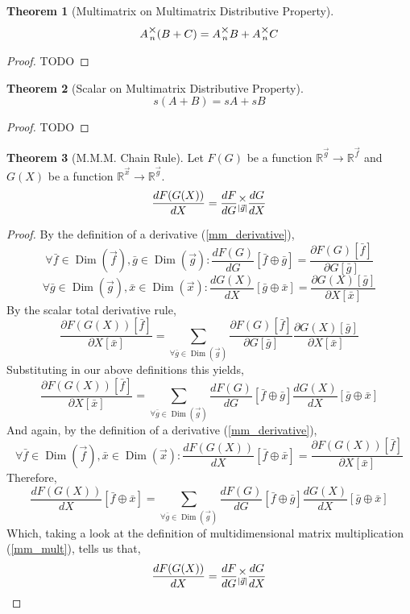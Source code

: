 \documentclass[12pt]{article}
\theoremstyle{definition}
\newtheorem{theorem}{Theorem}[section]
\theoremstyle{case}
\theoremstyle{ppart}
\DeclareMathOperator{\Dim}{Dim}
\newcommand{\mmult}[1]{\text{\raisebox{1ex}{$\underset{#1}{\times}$}}}
\begin{document}
\begin{theorem}[Multimatrix on Multimatrix Distributive Property]
\[ A \mmult{n} (B + C) = A \mmult{n} B + A \mmult{n} C \]
\end{theorem}
\begin{proof}
TODO
\end{proof}

\begin{theorem}[Scalar on Multimatrix Distributive Property]
\[ s(A + B) = sA + sB \]
\end{theorem}
\begin{proof}
TODO
\end{proof}


\begin{theorem}[M.M.M. Chain Rule]
\label{mmm_chain_rule}
Let $F(G)$ be a function $\mathbb{R}^{\vec{g}} \rightarrow \mathbb{R}^{\vec{f}}$
and $G(X)$ be a function $\mathbb{R}^{\vec{x}} \rightarrow \mathbb{R}^{\vec{g}}$.
\[
\frac{dF(G(X))}{dX} = \frac{dF}{dG} \mmult{|\vec{g}|} \frac{dG}{dX}
\]
\end{theorem}
\begin{proof}
By the definition of a derivative (\ref{mm_derivative}),
\[
\forall \bar{f} \in \Dim(\vec{f}), \bar{g} \in \Dim(\vec{g}):
\frac{dF(G)}{dG}[\bar{f} \oplus \bar{g}]
= \frac{\partial F(G)[\bar{f}]}{\partial G[\bar{g}]}
\]
\[
\forall \bar{g} \in \Dim(\vec{g}), \bar{x} \in \Dim(\vec{x}):
\frac{dG(X)}{dX}[\bar{g} \oplus \bar{x}]
= \frac{\partial G(X)[\bar{g}]}{\partial X[\bar{x}]}
\]
By the scalar total derivative rule,
\[
\frac{\partial F(G(X))[\bar{f}]}{\partial X[\bar{x}]}
= \sum_{\forall \bar{g} \in \Dim(\vec{g})} 
\frac{\partial F(G)[\bar{f}]}{\partial G[\bar{g}]}
\frac{\partial G(X)[\bar{g}]}{\partial X[\bar{x}]}
\]
Substituting in our above definitions this yields,
\[
\frac{\partial F(G(X))[\bar{f}]}{\partial X[\bar{x}]}
= \sum_{\forall \bar{g} \in \Dim(\vec{g})} 
\frac{dF(G)}{dG}[\bar{f} \oplus \bar{g}]
\frac{dG(X)}{dX}[\bar{g} \oplus \bar{x}]
\]
And again, by the definition of a derivative (\ref{mm_derivative}),
\[
\forall \bar{f} \in \Dim(\vec{f}), \bar{x} \in \Dim(\vec{x}):
\frac{dF(G(X))}{dX}[\bar{f} \oplus \bar{x}]
= \frac{\partial F(G(X))[\bar{f}]}{\partial X[\bar{x}]}
\]
Therefore,
\[
\frac{dF(G(X))}{dX}[\bar{f} \oplus \bar{x}]
= \sum_{\forall \bar{g} \in \Dim(\vec{g})} 
\frac{dF(G)}{dG}[\bar{f} \oplus \bar{g}]
\frac{dG(X)}{dX}[\bar{g} \oplus \bar{x}]
\]
Which, taking a look at the definition of multidimensional matrix multiplication
(\ref{mm_mult}), tells us that,
\[
\frac{dF(G(X))}{dX} = \frac{dF}{dG} \mmult{|\vec{g}|} \frac{dG}{dX}
\]
\end{proof}
\end{document}
